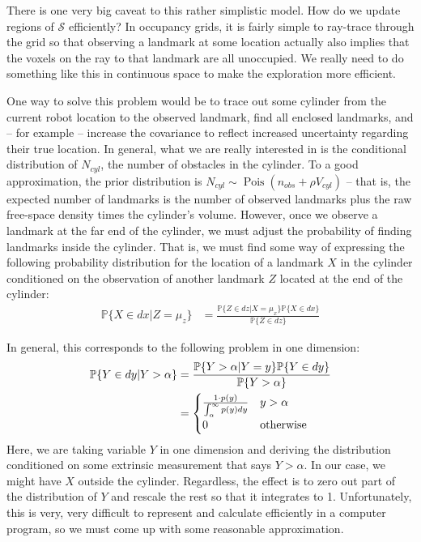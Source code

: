 \documentclass[12pt]{article}
\DeclareMathOperator{\Pois}{Pois}
\begin{document}
There is one very big caveat to this rather simplistic model. How do we update regions of $\mathcal{S}$ efficiently? In occupancy grids, it is fairly simple to ray-trace through the grid so that observing a landmark at some location actually also implies that the voxels on the ray to that landmark are all unoccupied. We really need to do something like this in continuous space to make the exploration more efficient.

One way to solve this problem would be to trace out some cylinder from the current robot location to the observed landmark, find all enclosed landmarks, and -- for example -- increase the covariance to reflect increased uncertainty regarding their true location. In general, what we are really interested in is the conditional distribution of $N_{cyl}$, the number of obstacles in the cylinder. To a good approximation, the prior distribution is $N_{cyl} \sim \Pois(n_{obs} + \rho V_{cyl})$ -- that is, the expected number of landmarks is the number of observed landmarks plus the raw free-space density times the cylinder's volume. However, once we observe a landmark at the far end of the cylinder, we must adjust the probability of finding landmarks inside the cylinder. That is, we must find some way of expressing the following probability distribution for the location of a landmark $X$ in the cylinder conditioned on the observation of another landmark $Z$ located at the end of the cylinder:
\begin{align}
  \mathbb{P}\{X \in dx | Z = \mu_z\} &=
  \frac{\mathbb{P}\{Z \in dz | X = \mu_x\} \mathbb{P}\{X \in dx\}}{\mathbb{P}\{Z \in dz\}}
\end{align}

In general, this corresponds to the following problem in one dimension:
\begin{align}
  \mathbb{P}\{Y \in dy | Y > \alpha\} &=
  \frac{\mathbb{P}\{Y > \alpha | Y = y\} \mathbb{P}\{Y \in dy\}}{\mathbb{P}\{Y > \alpha\}} \\
  &= \begin{cases}
    \frac{1 \cdot p(y)}{\int_{\alpha}^{\infty} p(y) dy} & y > \alpha \\
    0 & \textnormal{otherwise}
  \end{cases}
\end{align}
Here, we are taking variable $Y$ in one dimension and deriving the distribution conditioned on some extrinsic measurement that says $Y > \alpha$. In our case, we might have $X$ outside the cylinder. Regardless, the effect is to zero out part of the distribution of $Y$ and rescale the rest so that it integrates to 1. Unfortunately, this is very, very difficult to represent and calculate efficiently in a computer program, so we must come up with some reasonable approximation.
\end{document}
